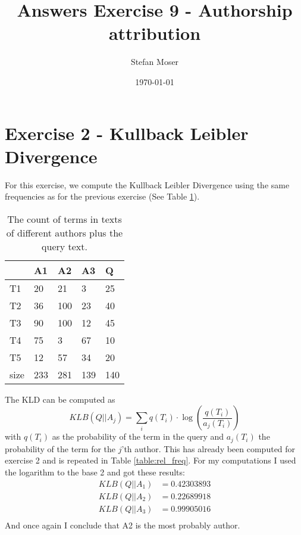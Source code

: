 \documentclass[11pt]{article}
\title{\textbf{Answers Exercise 9 - Authorship attribution}}
\author{Stefan Moser}
\date{\today}
\begin{document}
\maketitle

\section*{Exercise 2 - Kullback Leibler Divergence}
For this exercise, we compute the Kullback Leibler Divergence using the same frequencies
as for the previous exercise (See Table \ref{table:count}). 
\begin{table}[h]
\center
\begin{tabular}{|l|l|l|l|l|}
\hline
	 & A1 & A2 & A3 & Q\\
\hline
	T1 & 20 & 21 & 3 & 25\\
\hline
	T2 & 36 & 100 & 23 & 40\\
\hline
	T3 & 90 & 100 & 12 & 45\\
\hline
	T4 & 75 & 3 & 67 & 10\\
\hline
	T5 & 12 & 57 & 34 & 20\\
\hline
	size & 233 & 281 & 139 & 140\\
\hline
\end{tabular}
\caption{The count of terms in texts of different authors plus the query text.}
\label{table:count}
\end{table}
The KLD can be computed as
\begin{equation}
	KLB(Q || A_j) = \sum_i q(T_i) \cdot \log \left( \frac{q(T_i)}{a_j(T_i)} \right)
\end{equation}
with $q(T_i)$ as the probability of the term in the query and $a_j(T_i)$ the probability of 
the term for the $j$'th author. This has already been computed for exercise 2 and is repeated
in Table \ref{table:rel_freq}.
For my computations I used the logarithm to the base 2 and got these results:
\begin{align*}
	KLB(Q|| A_1) &= 0.42303893 \\
	KLB(Q|| A_2) &= 0.22689918 \\
	KLB(Q|| A_3) &= 0.99905016 \\
\end{align*}
And once again I conclude that A2 is the most probably author.
\end{document}
